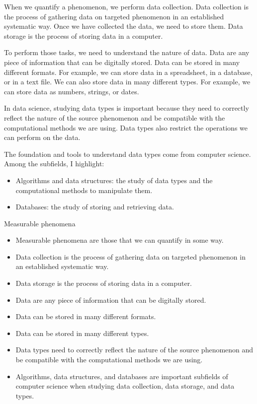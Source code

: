When we quantify a phenomenon, we perform data collection.  Data collection is the process
of gathering data on targeted phenomenon in an established systematic way.
Once we have collected the data, we need to store them.  Data storage is the process of
storing data in a computer.

To perform those tasks, we need to understand the nature of data.  Data are any piece of
information that can be digitally stored.  Data can be stored in many different formats.
For example, we can store data in a spreadsheet, in a database, or in a text file.  We can
also store data in many different types.  For example, we can store data as numbers,
strings, or dates.

In data science, studying data types is important because they need to correctly reflect
the nature of the source phenomenon and be compatible with the computational methods we
are using.  Data types also restrict the operations we can perform on the data.

The foundation and tools to understand data types come from computer science.  Among the
subfields, I highlight:
\begin{itemize}
  \item Algorithms and data structures: the study of data types and the computational
    methods to manipulate them.
  \item Databases: the study of storing and retrieving data.
\end{itemize}

\begin{slidebox}{Measurable phenomena}{}
  \begin{itemize}
    \item Measurable phenomena are those that we can quantify in some way.
    \item Data collection is the process of gathering data on targeted phenomenon in an
      established systematic way.
    \item Data storage is the process of storing data in a computer.
    \item Data are any piece of information that can be digitally stored.
    \item Data can be stored in many different formats.
    \item Data can be stored in many different types.
    \item Data types need to correctly reflect the nature of the source phenomenon and be
      compatible with the computational methods we are using.
    \item Algorithms, data structures, and databases are important subfields of computer
      science when studying data collection, data storage, and data types.
  \end{itemize}
\end{slidebox}

